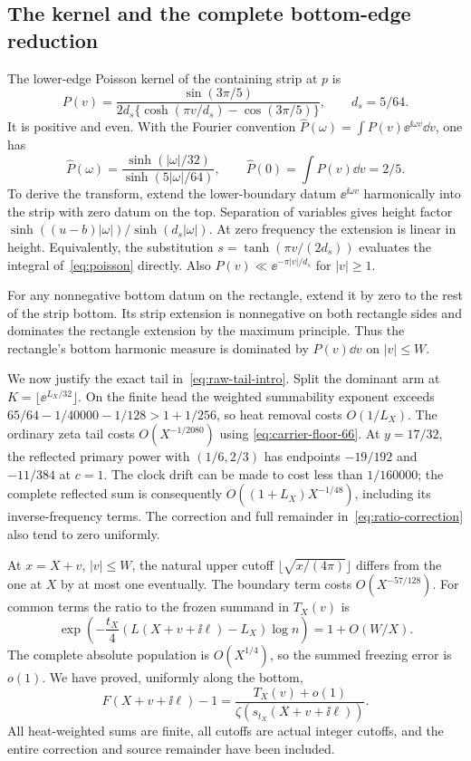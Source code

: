 \subsection{The kernel and the complete bottom-edge reduction}

The lower-edge Poisson kernel of the containing strip at $p$ is
\begin{equation}\label{eq:poisson}
 P(v)=\frac{\sin(3\pi/5)}
 {2d_s\{\cosh(\pi v/d_s)-\cos(3\pi/5)\}},\qquad d_s=5/64.
\end{equation}
It is positive and even. With the Fourier convention
$\widehat P(\omega)=\int P(v)\ee^{\ii\omega v}\dd v$, one has
\begin{equation}\label{eq:poisson-transform}
 \widehat P(\omega)=\frac{\sinh(|\omega|/32)}
                         {\sinh(5|\omega|/64)},\qquad
 \widehat P(0)=\int P(v)\dd v=2/5.
\end{equation}
To derive the transform, extend the lower-boundary datum
$\ee^{\ii\omega v}$ harmonically into the strip with zero datum on
the top. Separation of variables gives height factor
$\sinh((u-b)|\omega|)/\sinh(d_s|\omega|)$.
At zero frequency the extension is linear in height. Equivalently,
the substitution $s=\tanh(\pi v/(2d_s))$ evaluates the integral
of~\eqref{eq:poisson} directly. Also $P(v)\ll\ee^{-\pi|v|/d_s}$
for $|v|\ge1$.

For any nonnegative bottom datum on the rectangle, extend it by zero
to the rest of the strip bottom. Its strip extension is nonnegative
on both rectangle sides and dominates the rectangle extension by the
maximum principle. Thus the rectangle's bottom harmonic measure is
dominated by $P(v)\dd v$ on $|v|\le W$.

We now justify the exact tail in~\eqref{eq:raw-tail-intro}.
Split the dominant arm at $K=\lfloor\ee^{L_X/32}\rfloor$.
On the finite head the weighted summability exponent exceeds
$65/64-1/40000-1/128>1+1/256$, so heat removal costs $O(1/L_X)$.
The ordinary zeta tail costs $O(X^{-1/2080})$ using
\eqref{eq:carrier-floor-66}.
At $y=17/32$, the reflected primary power with $(1/6,2/3)$
has endpoints $-19/192$ and $-11/384$ at $c=1$.
The clock drift can be made to cost less than $1/160000$;
the complete reflected sum is consequently
$O((1+L_X)X^{-1/48})$, including its inverse-frequency terms.
The correction and full remainder in~\eqref{eq:ratio-correction}
also tend to zero uniformly.

At $x=X+v$, $|v|\le W$, the natural upper cutoff
$\lfloor\sqrt{x/(4\pi)}\rfloor$ differs from the one at $X$
by at most one eventually. The boundary term costs $O(X^{-57/128})$.
For common terms the ratio to the frozen summand in $T_X(v)$ is
\[
 \exp\left(-\frac{t_X}{4}(L(X+v+\ii\ell)-L_X)\log n\right)
 =1+O(W/X).
\]
The complete absolute population is $O(X^{1/4})$, so the summed
freezing error is $o(1)$. We have proved, uniformly along the bottom,
\begin{equation}\label{eq:bottom-tail}
 F(X+v+\ii\ell)-1
 =\frac{T_X(v)+o(1)}{\zeta(s_{t_X}(X+v+\ii\ell))}.
\end{equation}
All heat-weighted sums are finite, all cutoffs are actual integer
cutoffs, and the entire correction and source remainder have been
included.

